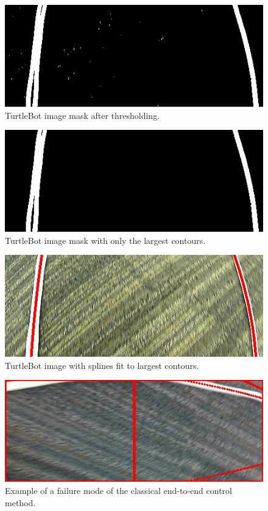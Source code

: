 \begin{figure}
  \centering
  \includegraphics[scale=0.5]{figures/classical_thresh.jpg}
  \caption{TurtleBot image mask after thresholding.}
  \label{fig:classical_thresh}
\end{figure}

\begin{figure}
  \centering
  \includegraphics[scale=0.5]{figures/classical_contours.jpg}
  \caption{TurtleBot image mask with only the largest contours.}
  \label{fig:classical_contours}
\end{figure}

\begin{figure}
  \centering
  \includegraphics[scale=0.5]{figures/classical_fit.jpg}
  \caption{TurtleBot image with splines fit to largest contours.}
  \label{fig:classical_fit}
\end{figure}

\begin{figure}
  \centering
  \includegraphics[scale=0.5]{figures/classical_fail.jpg}
  \caption{Example of a failure mode of the classical end-to-end control method.}
  \label{fig:classical_fail}
\end{figure}
